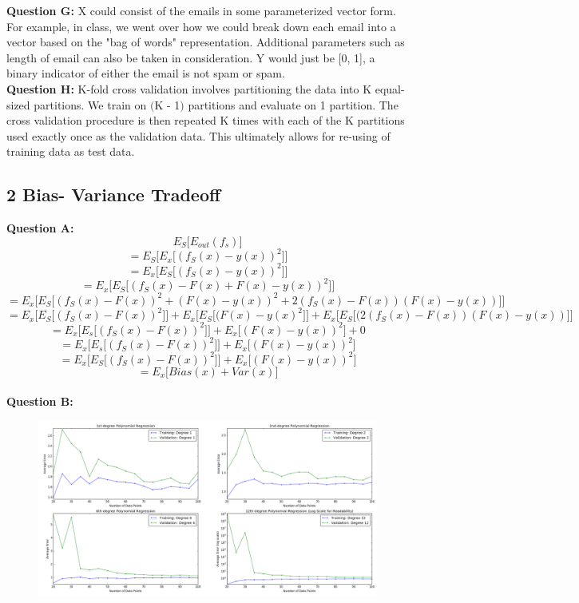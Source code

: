 \documentclass[12 pt]{article}
\begin{document}
	\noindent\textbf{Question G:} X could consist of the emails in some parameterized vector form. For example, in class, we went over how we could break down each email into a vector based on the "bag of words" representation. Additional parameters such as length of email can also be taken in consideration. Y would just be [0, 1], a binary indicator of either the email is not spam or spam. \\
	
	\noindent\textbf{Question H:} K-fold cross validation involves partitioning the data into K equal-sized partitions. We train on $($K - 1$)$ partitions and evaluate on 1 partition. The cross validation procedure is then repeated K times with each of the K partitions used exactly once as the validation data. This ultimately allows for re-using of training data as test data.
 
	
	\subsection*{2 Bias- Variance Tradeoff}
	\noindent\textbf{Question A:}
	\[ E_S\big[ E_{out}(f_s)\big]\]
	\[ = E_S \Big[ E_x \Big[ (f_S(x) - y(x))^2 \Big]  \Big]\]
	\[ = E_x \Big[ E_S \Big[ (f_S(x) - y(x))^2 \Big]  \Big]\]
	\[ = E_x \Big[ E_S \Big[(f_S(x) - F(x) + F(x) - y(x))^2 \Big]\Big] \]
	\[ = E_x \Big[ E_S \Big[ (f_S(x) - F(x))^2 + (F(x) - y(x))^2 +
	2(f_S(x) - F(x))(F(x) - y(x)) \Big]\Big] \]
	\[ = E_x \Big[ E_S \Big[(f_S(x) - F(x))^2 \Big]\Big] + E_x\Big[ E_S \Big[ (F(x) - y(x)^2 \Big] \Big] + E_x \Big [ E_S \Big[ (2(f_S(x) - F(x))(F(x) - y(x)) \Big]\Big] \]
	\[ = E_x \Big[ E_s \Big [(f_S(x) - F(x))^2 \Big]\Big] + E_x\Big[(F(x) - y(x))^2\Big] + 0 \]
	\[ = E_x \Big[ E_s \Big[ (f_S(x) - F(x))^2 \Big]\Big] + E_x\Big[(F(x) - y(x))^2\Big] \]
	\[ = E_x \Big[ E_S \Big[ (f_S(x) - F(x))^2 \Big]\Big] + E_x\Big[(F(x) - y(x))^2 \Big]\]
	\[ = E_x\Big[Bias(x) + Var(x) \Big]\]
	\\
	
	\noindent\textbf{Question B:} \\
	\noindent
	\begin{figure}[h]
	\includegraphics[width=17cm]{LearningCurves}
	\end{figure}	
	
\end{document}
